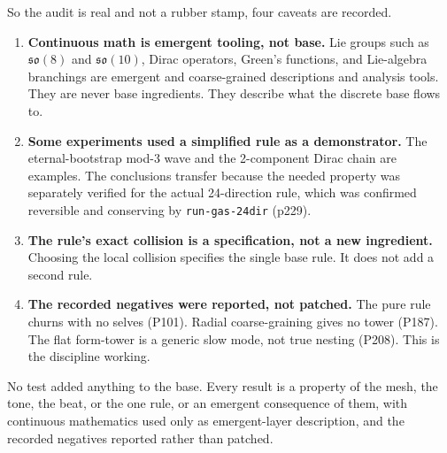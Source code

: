 So the audit is real and not a rubber stamp, four caveats are recorded.

\begin{enumerate}
  \item \textbf{Continuous math is emergent tooling, not base.} Lie groups such as $\mathfrak{so}(8)$ and
  $\mathfrak{so}(10)$, Dirac operators, Green's functions, and Lie-algebra branchings are emergent and
  coarse-grained descriptions and analysis tools. They are never base ingredients. They describe what the discrete
  base flows to.
  \item \textbf{Some experiments used a simplified rule as a demonstrator.} The eternal-bootstrap mod-3 wave and
  the 2-component Dirac chain are examples. The conclusions transfer because the needed property was separately
  verified for the actual 24-direction rule, which was confirmed reversible and conserving by
  \texttt{run-gas-24dir} (p229).
  \item \textbf{The rule's exact collision is a specification, not a new ingredient.} Choosing the local collision
  specifies the single base rule. It does not add a second rule.
  \item \textbf{The recorded negatives were reported, not patched.} The pure rule churns with no selves (P101).
  Radial coarse-graining gives no tower (P187). The flat form-tower is a generic slow mode, not true nesting
  (P208). This is the discipline working.
\end{enumerate}

\begin{principle}
No test added anything to the base. Every result is a property of the mesh, the tone, the beat, or the one rule,
or an emergent consequence of them, with continuous mathematics used only as emergent-layer description, and the
recorded negatives reported rather than patched.
\end{principle}
